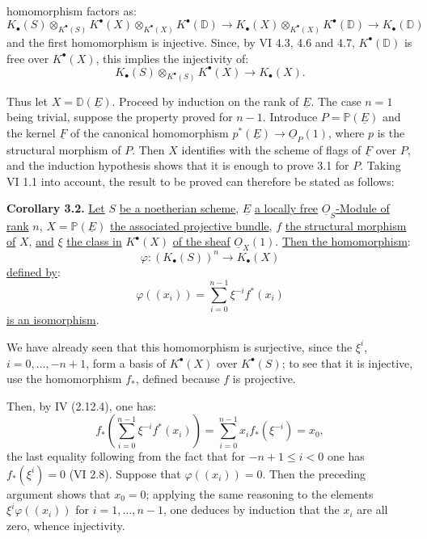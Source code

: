 %

homomorphism factors as:
\[
K_\bullet(S)\otimes_{K^{\bullet}(S)}K^{\bullet}(X)\otimes_{K^{\bullet}(X)}K^{\bullet}(\mathbb D)
\longrightarrow K_\bullet(X)\otimes_{K^{\bullet}(X)}K^{\bullet}(\mathbb D)
\longrightarrow K_\bullet(\mathbb D)
\]
and the first homomorphism is injective. Since, by VI 4.3, 4.6 and 4.7, $K^{\bullet}(\mathbb D)$ is free over $K^{\bullet}(X)$, this implies the injectivity of:
\[
K_\bullet(S)\otimes_{K^{\bullet}(S)}K^{\bullet}(X)\to K_\bullet(X).
\]

Thus let $X=\mathbb D(\underline{E})$. Proceed by induction on the rank of $\underline{E}$. The case $n=1$ being trivial, suppose the property proved for $n-1$. Introduce $P=\mathbb P(\underline{E})$ and the kernel $\underline{F}$ of the canonical homomorphism $p^*(\underline{E})\to \underline{O}_P(1)$, where $p$ is the structural morphism of $P$. Then $X$ identifies with the scheme of flags of $\underline{F}$ over $P$, and the induction hypothesis shows that it is enough to prove 3.1 for $P$. Taking VI 1.1 into account, the result to be proved can therefore be stated as follows:

\textbf{Corollary 3.2.} \uline{Let} $S$ \uline{be a noetherian scheme}, $\underline{E}$ \uline{a locally free} $\underline{O}_S$\uline{-Module of rank} $n$, $X=\mathbb P(\underline{E})$ \uline{the associated projective bundle}, $f$ \uline{the structural morphism of} $X$, \uline{and} $\xi$ \uline{the class in} $K^{\bullet}(X)$ \uline{of the sheaf} $\underline{O}_X(1)$. \uline{Then the homomorphism}:
\[
\varphi:(K_\bullet(S))^n\longrightarrow K_\bullet(X)
\]
\uline{defined by}:
\[
\varphi((x_i))=\sum_{i=0}^{n-1}\xi^{-i}f^*(x_i)
\]
\uline{is an isomorphism}.

We have already seen that this homomorphism is surjective, since the $\xi^i$, $i=0,\ldots,-n+1$, form a basis of $K^{\bullet}(X)$ over $K^{\bullet}(S)$; to see that it is injective, use the homomorphism $f_*$, defined because $f$ is projective.


%

Then, by IV (2.12.4), one has:
\[
f_*\left(\sum_{i=0}^{n-1}\xi^{-i}f^*(x_i)\right)
=\sum_{i=0}^{n-1}x_i f_*(\xi^{-i})=x_0,
\]
the last equality following from the fact that for $-n+1\le i<0$ one has $f_*(\xi^i)=0$ (VI 2.8). Suppose that $\varphi((x_i))=0$. Then the preceding argument shows that $x_0=0$; applying the same reasoning to the elements $\xi^i\varphi((x_i))$ for $i=1,\ldots,n-1$, one deduces by induction that the $x_i$ are all zero, whence injectivity.

